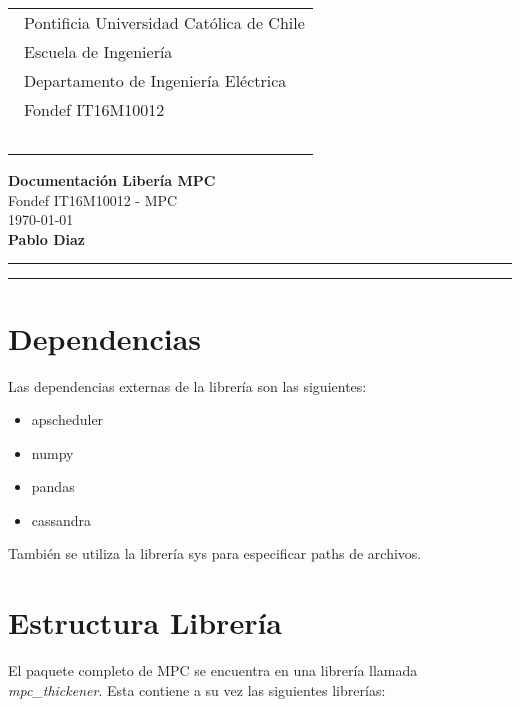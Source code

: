 \documentclass{article}
\begin{document}
\thispagestyle{empty}


\hspace*{2cm}
 \begin{tabular}{l}
  {\ Pontificia Universidad Católica de Chile}\\
  {\ Escuela de Ingeniería}\\
  {\ Departamento de Ingeniería Eléctrica}\\
  {\ Fondef IT16M10012 }\\
  {\  }\\
 \end{tabular}
 \hfill 
\vspace*{-0.2cm}
\begin{center}
{\Large\bf Documentación Libería MPC}\\
\vspace*{2mm}
{\Large Fondef IT16M10012 - MPC}\\
{\today{}}\\
\vspace*{1mm}
{\bf Pablo Diaz }\\
\vspace*{1mm}
\end{center}
\hrule\vspace*{2pt}\hrule
\setcounter{page}{1}
\section{Dependencias}

Las dependencias externas de la librería son las siguientes:
\begin{itemize}
\item apscheduler
\item numpy
\item pandas
\item cassandra
\end{itemize}

También se utiliza la librería sys para especificar paths de archivos.
\section{Estructura Librería}
El paquete completo de MPC se encuentra en una librería llamada \emph{mpc\_thickener}. Esta contiene a su vez las siguientes librerías:
\end{document}
